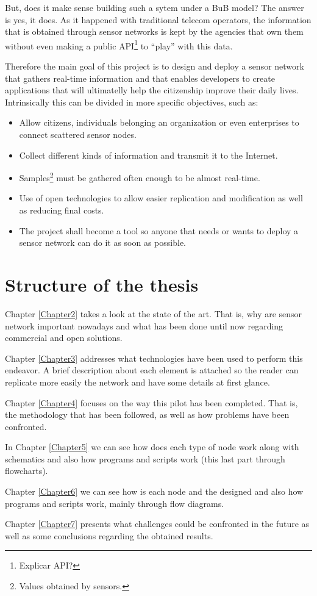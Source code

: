 But, does it make sense building such a sytem under a BuB model? The answer is yes, it does. As it happened with traditional telecom operators, the information that is obtained through sensor networks is kept by the agencies that own them without even making a public API\footnote{Explicar API?} to ``play'' with this data.

Therefore the main goal of this project is to design and deploy a sensor network that gathers real-time information and that enables developers to create applications that will ultimatelly help the citizenship improve their daily lives. Intrinsically this can be divided in more specific objectives, such as:

\begin{itemize}
    \item Allow citizens, individuals belonging an organization or even enterprises to connect scattered sensor nodes.
    \item Collect different kinds of information and transmit it to the Internet.
    \item Samples\footnote{Values obtained by sensors.} must be gathered often enough to be almost real-time.
    \item Use of open technologies to allow easier replication and modification as well as reducing final costs.
    \item The project shall become a tool so anyone that needs or wants to deploy a sensor network can do it as soon as possible.
\end{itemize}

\section{Structure of the thesis}

Chapter \ref{Chapter2} takes a look at the state of the art. That is, why are sensor network important nowadays and what has been done until now regarding commercial and open solutions.

Chapter \ref{Chapter3} addresses what technologies have been used to perform this endeavor. A brief description about each element is attached so the reader can replicate more easily the network and have some details at first glance.

Chapter \ref{Chapter4} focuses on the way this pilot has been completed. That is, the methodology that has been followed, as well as how problems have been confronted.

In Chapter \ref{Chapter5} we can see how does each type of node work along with schematics and also how programs and scripts work (this last part through flowcharts).

Chapter \ref{Chapter6} we can see how is each node and the designed and also how programs and scripts work, mainly through flow diagrams.

Chapter \ref{Chapter7} presents what challenges could be confronted in the future as well as some conclusions regarding the obtained results.
